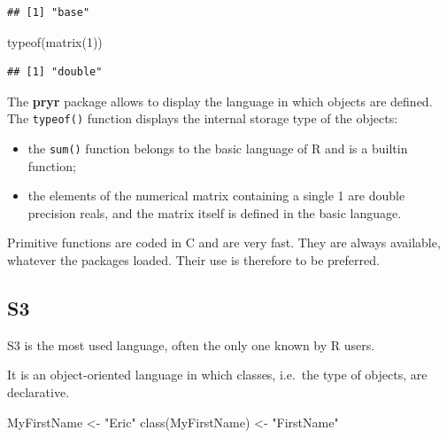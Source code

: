 \documentclass[
  12pt,
  american,
  a4paper,
  extrafontsizes,onecolumn,openright
  ]{memoir}
\newenvironment{Shaded}{\begin{snugshade}}{\end{snugshade}}
\newcommand{\DecValTok}[1]{\textcolor[rgb]{0.00,0.00,0.81}{#1}}
\newcommand{\FunctionTok}[1]{\textcolor[rgb]{0.00,0.00,0.00}{#1}}
\newcommand{\NormalTok}[1]{#1}
\newcommand{\OtherTok}[1]{\textcolor[rgb]{0.56,0.35,0.01}{#1}}
\newcommand{\StringTok}[1]{\textcolor[rgb]{0.31,0.60,0.02}{#1}}
\providecommand{\tightlist}{%
  \setlength{\itemsep}{0pt}\setlength{\parskip}{0pt}}
\begin{document}
\begin{verbatim}
## [1] "base"
\end{verbatim}

\begin{Shaded}
\begin{Highlighting}[]
\FunctionTok{typeof}\NormalTok{(}\FunctionTok{matrix}\NormalTok{(}\DecValTok{1}\NormalTok{))}
\end{Highlighting}
\end{Shaded}

\begin{verbatim}
## [1] "double"
\end{verbatim}

\normalsize

The \textbf{pryr} package allows to display the language in which objects are defined.
The \texttt{typeof()} function displays the internal storage type of the objects:

\begin{itemize}
\tightlist
\item
  the \texttt{sum()} function belongs to the basic language of R and is a builtin function;
\item
  the elements of the numerical matrix containing a single 1 are double precision reals, and the matrix itself is defined in the basic language.
\end{itemize}

Primitive functions are coded in C and are very fast.
They are always available, whatever the packages loaded.
Their use is therefore to be preferred.

\hypertarget{sec:S3}{%
\subsection{S3}\label{sec:S3}}

S3 is the most used language, often the only one known by R users.

It is an object-oriented language in which classes, i.e.~the type of objects, are declarative.

\scriptsize

\begin{Shaded}
\begin{Highlighting}[]
\NormalTok{MyFirstName }\OtherTok{\textless{}{-}} \StringTok{"Eric"}
\FunctionTok{class}\NormalTok{(MyFirstName) }\OtherTok{\textless{}{-}} \StringTok{"FirstName"}
\end{Highlighting}
\end{Shaded}
\end{document}
